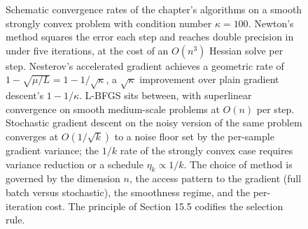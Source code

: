 \begin{figure}[p]
\caption[Convergence rates of optimisation methods]{Schematic
convergence rates of the chapter's algorithms on a smooth strongly
convex problem with condition number $\kappa = 100$. Newton's
method squares the error each step and reaches double precision in
under five iterations, at the cost of an $O(n^{3})$ Hessian solve
per step. Nesterov's accelerated gradient achieves a geometric
rate of $1 - \sqrt{\mu/L} = 1 - 1/\sqrt{\kappa}$, a $\sqrt{\kappa}$
improvement over plain gradient descent's $1 - 1/\kappa$. L-BFGS
sits between, with superlinear convergence on smooth medium-scale
problems at $O(n)$ per step. Stochastic gradient descent on the
noisy version of the same problem converges at $O(1/\sqrt{k})$ to
a noise floor set by the per-sample gradient variance; the $1/k$
rate of the strongly convex case requires variance reduction or a
schedule $\eta_{k} \propto 1/k$. The choice of method is governed
by the dimension $n$, the access pattern to the gradient (full
batch versus stochastic), the smoothness regime, and the
per-iteration cost. The principle of Section 15.5 codifies the
selection rule.}
\label{fig:vol02:ch15:method-comparison}
\end{figure}
